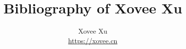 \documentclass{article}
\title{Bibliography of Xovee Xu}
\author{Xovee Xu\\\url{https://xovee.cn}}
\begin{document}
\maketitle

\nocite{*}



\end{document}
